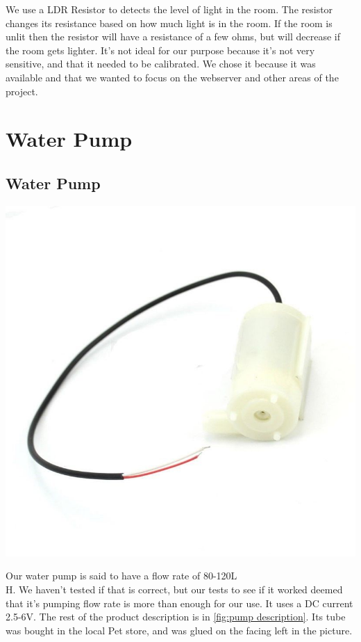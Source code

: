 \documentclass[a4paper,12pt,twoside,openright,titlepage]{book}
\begin{document}
We use a LDR Resistor to detects the level of light in the room. The resistor changes its resistance based on how much light is in the room. If the room is unlit then the resistor will have a resistance of a few ohms, but will decrease if the room gets lighter. It's not ideal for our purpose because it's not very sensitive, and that it needed to be calibrated. We chose it because it was available and that we wanted to focus on the webserver and other areas of the project.

\section{Water Pump}
\subsection{Water Pump}
\begin{center}
	\includegraphics[scale=0.3]{Water-Pump}
\end{center}

Our water pump is said to have a flow rate of 80-120L\\H. We haven't tested if that is correct, but our tests to see if it worked deemed that it's pumping flow rate is more than enough for our use. It uses a DC current 2.5-6V. The rest of the product description is in \ref{fig:pump description}. Its tube was bought in the local Pet store, and was glued on the facing  left in the picture.
\end{document}
